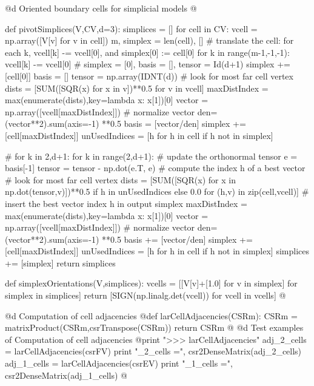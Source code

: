 \documentclass[11pt,oneside]{article}	%
\begin{document}
@d Oriented boundary cells for simplicial models
@{def pivotSimplices(V,CV,d=3):
	simplices = []
	for cell in CV:
		vcell = np.array([V[v] for v in cell])
		m, simplex = len(cell), []
		# translate the cell: for each k, vcell[k] -= vcell[0], and simplex[0] := cell[0]
		for k in range(m-1,-1,-1): vcell[k] -= vcell[0]
		# simplex = [0], basis = [], tensor = Id(d+1)
		simplex += [cell[0]]
		basis = []
		tensor = np.array(IDNT(d))
		# look for most far cell vertex
		dists = [SUM([SQR(x) for x in v])**0.5 for v in vcell]
		maxDistIndex = max(enumerate(dists),key=lambda x: x[1])[0]
		vector = np.array([vcell[maxDistIndex]])
		# normalize vector
		den=(vector**2).sum(axis=-1) **0.5
		basis = [vector/den]
		simplex += [cell[maxDistIndex]]
		unUsedIndices = [h for h in cell if h not in simplex]
		
		# for k in {2,d+1}:
		for k in range(2,d+1):
			# update the orthonormal tensor
			e = basis[-1]
			tensor = tensor - np.dot(e.T, e)
			# compute the index h of a best vector
			# look for most far cell vertex
			dists = [SUM([SQR(x) for x in np.dot(tensor,v)])**0.5
			if h in unUsedIndices else 0.0
			for (h,v) in zip(cell,vcell)]
			# insert the best vector index h in output simplex
			maxDistIndex = max(enumerate(dists),key=lambda x: x[1])[0]
			vector = np.array([vcell[maxDistIndex]])
			# normalize vector
			den=(vector**2).sum(axis=-1) **0.5
			basis += [vector/den]
			simplex += [cell[maxDistIndex]]
			unUsedIndices = [h for h in cell if h not in simplex]
		simplices += [simplex]
	return simplices

def simplexOrientations(V,simplices):
	vcells = [[V[v]+[1.0] for v in simplex] for simplex in simplices]
	return [SIGN(np.linalg.det(vcell)) for vcell in vcells]
@}
@d Computation of cell adjacencies
@{def larCellAdjacencies(CSRm):
    CSRm = matrixProduct(CSRm,csrTranspose(CSRm))
    return CSRm
@}
@d Test examples of Computation of cell adjacencies
@{print "\n>>> larCellAdjacencies"
adj_2_cells = larCellAdjacencies(csrFV)
print "\nadj_2_cells =\n", csr2DenseMatrix(adj_2_cells)
adj_1_cells = larCellAdjacencies(csrEV)
print "\nadj_1_cells =\n", csr2DenseMatrix(adj_1_cells)
@}
\end{document}

